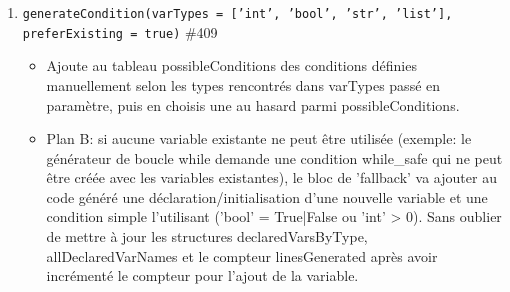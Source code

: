 \documentclass[11pt,a4paper]{article}
\begin{document}
\begin{enumerate}
    \item \texttt{generateCondition(varTypes = ['int', 'bool', 'str', 'list'], preferExisting = true)} \#409
    \begin{itemize}
        \item Ajoute au tableau possibleConditions des conditions définies manuellement selon les types rencontrés dans varTypes passé en paramètre, puis en choisis une au hasard parmi possibleConditions.
        \item Plan B: si aucune variable existante ne peut être utilisée (exemple: le générateur de boucle while demande une condition while\_safe qui ne peut être créée avec les variables existantes), le bloc de 'fallback' va ajouter au code généré une déclaration/initialisation d'une nouvelle variable et une condition simple l'utilisant ('bool' = True|False ou 'int' > 0). Sans oublier de mettre à jour les structures declaredVarsByType, allDeclaredVarNames et le compteur linesGenerated après avoir incrémenté le compteur pour l'ajout de la variable.
    \end{itemize}



\end{enumerate}
\end{document}
